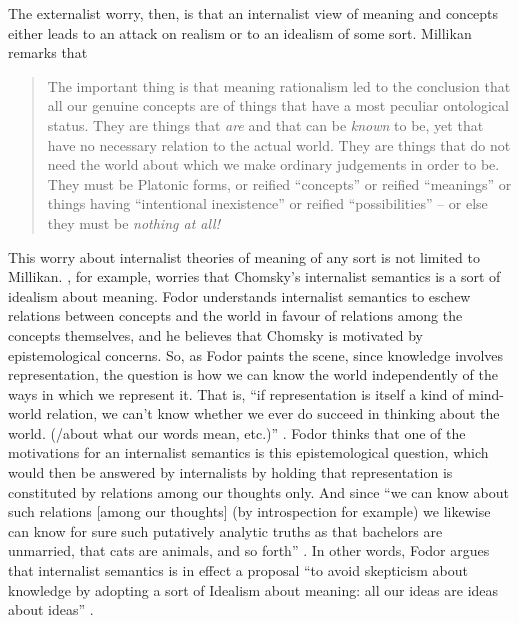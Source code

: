 The externalist worry, then, is that an internalist view of meaning and concepts either leads to an attack on realism or to an idealism of some sort. Millikan remarks that
\begin{quote}
The important thing is that meaning rationalism led to the conclusion that all our genuine concepts are of things that have a most peculiar ontological status. They are things that \textit{are} and that can be \textit{known} to be, yet that have no necessary relation to the actual world. They are things that do not need the world about which we make ordinary judgements in order to be. They must be Platonic forms, or reified “concepts” or reified “meanings” or things having “intentional inexistence” or reified “possibilities” – or else they must be \textit{nothing at all!} \citep[328, emphasis in original]{Millikan1984}
\end{quote}

This worry about internalist theories of meaning of any sort is not limited to Millikan. \cite{Fodor2007}, for example, worries that Chomsky’s internalist semantics is a sort of idealism about meaning. Fodor understands internalist semantics to eschew relations between concepts and the world in favour of relations among the concepts themselves, and he believes that Chomsky is motivated by epistemological concerns. So, as Fodor paints the scene, since knowledge involves representation, the question is how we can know the world independently of the ways in which we represent it. That is, “if representation is itself a kind of mind-world relation, we can’t know whether we ever do succeed in thinking about the world. (/about what our words mean, etc.)” \citep[6]{Fodor2007}. Fodor thinks that one of the motivations for an internalist semantics is this epistemological question, which would then be answered by internalists by holding that representation is constituted by relations among our thoughts only. And since “we can know about such relations [among our thoughts] (by introspection for example) we likewise can know for sure such putatively analytic truths as that bachelors are unmarried, that cats are animals, and so forth” \citep[6]{Fodor2007}. In other words, Fodor argues that internalist semantics is in effect a proposal “to avoid skepticism about knowledge by adopting a sort of Idealism about meaning: all our ideas are ideas about ideas” \citep[6]{Fodor2007}.


